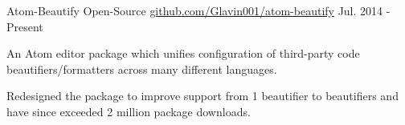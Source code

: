 

\begin{cventries}

  \cventry
    {Atom-Beautify} %
    {Open-Source} %
    {\href{https://github.com/Glavin001/atom-beautify}{github.com/Glavin001/atom-beautify}} %
    {Jul. 2014 - Present} %
    {
      \begin{cvitems} %
        \item {An Atom editor package which unifies configuration of  third-party code beautifiers/formatters across many different languages.}
        \item {Redesigned the package to improve support from 1 beautifier to  beautifiers and have since exceeded 2 million package downloads.}
      \end{cvitems}
    }


\end{cventries}
